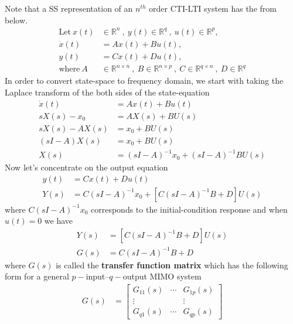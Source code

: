\documentclass[twoside]{article}
\begin{document}
Note that a SS representation of an $n^{th}$ order CTI-LTI system has the from below.
%
\begin{align*}
  \mathrm{Let} \ x(t) &\in \mathbb{R}^n \ , \ y(t) \in \mathbb{R}^q \ ,\  u(t) \in
  \mathbb{R}^p , \\
  \dot{x}(t) &= A x(t) + B u(t) , \\
  y(t) &= C x(t) + D u(t) , \\
  \mathrm{where} \ A &\in \mathbb{R}^{n \times n} \ , \ 
    B \in \mathbb{R}^{n \times p} \ ,\  C \in \mathbb{R}^{q \times n} \ , \ D \in \mathbb{R}^q
\end{align*}
%
In order to convert state-space to frequency domain, we start with taking the Laplace transform of the 
both sides of the state-equation 
%
\begin{align*}
\dot{x}(t) &= A x(t) + B u(t) 
\\
s X(s) - x_0 &= A X(s) + B U(s)
\\
s X(s) - A X(s) &= x_0 +  B U(s)
\\
\left( s I - A \right) X(s) &=  x_0 +  B U(s)
\\
X(s) &= \left( s I - A \right)^{-1} x_0 + \left( s I - A \right)^{-1} B U(s)
\end{align*}
%
Now let's concentrate on the output equation
%
\begin{align*}
y(t) &= C x(t) + D u(t)
\\
Y(s) &= C  \left( s I - A \right)^{-1} x_0 + \left[ C \left( s I - A \right)^{-1} B + D \right] U(s)
\end{align*}
%
where $C  \left( s I - A \right)^{-1} x_0$ corresponds to the initial-condition response and 
when $u(t)=0$ we have
%
\begin{align*}
Y(s) &=  \left[ C \left( s I - A \right)^{-1} B + D \right] U(s)
\\
G(s) &= C \left( s I - A \right)^{-1} B + D
\end{align*}
%
where $G(s)$ is called the \textbf{transfer function matrix} which has
the following form for a general $p-$input--$q-$output MIMO system
%
\begin{align*}
G(s) &= \left[ \begin{array}{ccc} G_{11}(s) & \cdots & G_{1p}(s) \\ \vdots & & \vdots \\ G_{q1}(s) & \cdots & G_{qp}(s)  \end{array} \right]
\end{align*}
\end{document}
